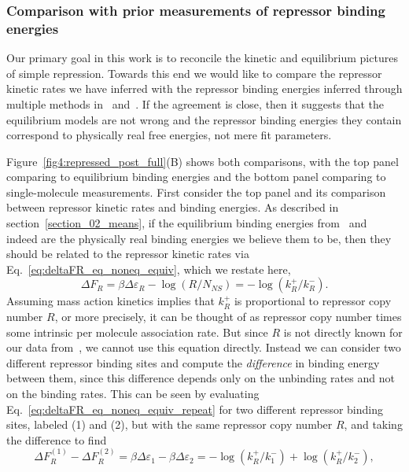 \subsubsection{Comparison with prior measurements of repressor binding energies}
Our primary goal in this work is to reconcile the kinetic and equilibrium
pictures of simple repression. Towards this end we would like to compare the
repressor kinetic rates we have inferred with the repressor binding energies
inferred through multiple methods in~\cite{Garcia2011a}
and~\cite{Razo-Mejia2018}. If the agreement is close, then it suggests that the
equilibrium models are not wrong and the repressor binding energies they contain
correspond to physically real free energies, not mere fit parameters.

Figure~\ref{fig4:repressed_post_full}(B) shows both comparisons, with the top
panel comparing to equilibrium binding energies and the bottom panel comparing
to single-molecule measurements. First consider the top panel and its comparison
between repressor kinetic rates and binding energies. As described in
section~\ref{section_02_means}, if the equilibrium binding energies
from~\cite{Garcia2011a} and~\cite{Razo-Mejia2018} indeed are the physically real
binding energies we believe them to be, then they should be related to the
repressor kinetic rates via Eq.~\ref{eq:deltaFR_eq_noneq_equiv}, which we
restate here,
\begin{equation}
\Delta F_R = \beta\Delta\varepsilon_R - \log(R/N_{NS})
        = - \log(k_R^+/k_R^-).
\label{eq:deltaFR_eq_noneq_equiv_repeat}
\end{equation}
Assuming mass action kinetics implies that $k_R^+$ is proportional to repressor
copy number $R$, or more precisely, it can be thought of as repressor copy
number times some intrinsic per molecule association rate. But since $R$ is not
directly known for our data from~\cite{Jones2014}, we cannot use this equation
directly. Instead we can consider two different repressor binding sites and
compute the \textit{difference} in binding energy between them, since this
difference depends only on the unbinding rates and not on the binding rates.
This can be seen by evaluating Eq.~\ref{eq:deltaFR_eq_noneq_equiv_repeat} for
two different repressor binding sites, labeled (1) and (2), but with the same
repressor copy number $R$, and taking the difference to find
\begin{equation}
\Delta F_R^{(1)} - \Delta F_R^{(2)}
= \beta\Delta\varepsilon_1 - \beta\Delta\varepsilon_2
= - \log(k_R^+/k_1^-) + \log(k_R^+/k_2^-),
\end{equation}
